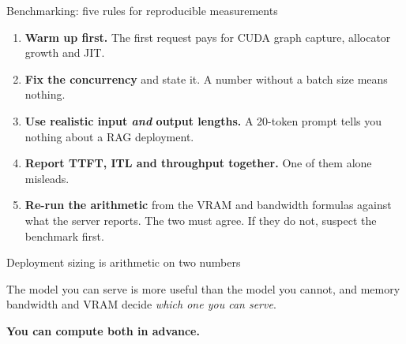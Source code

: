 \documentclass[aspectratio=169,10pt]{beamer}
\begin{document}
\begin{frame}{Benchmarking: five rules for reproducible measurements}
  \begin{enumerate}
    \item \textbf{Warm up first.} The first request pays for CUDA graph
          capture, allocator growth and JIT.
    \item \textbf{Fix the concurrency} and state it. A number without a batch
          size means nothing.
    \item \textbf{Use realistic input \emph{and} output lengths.}
          A 20-token prompt tells you nothing about a RAG deployment.
    \item \textbf{Report TTFT, ITL and throughput together.}
          One of them alone misleads.
    \item \textbf{Re-run the arithmetic} from the VRAM and bandwidth formulas
          against what the server reports. The two must agree. If they do not,
          suspect the benchmark first.
  \end{enumerate}
\end{frame}

\begin{frame}{Deployment sizing is arithmetic on two numbers}
  \vspace{1.4em}
  \begin{center}
    \begin{minipage}{0.9\textwidth}
      \begin{alertblock}{}
        \centering\large
        The model you can serve is more useful than the model you cannot,
        and memory bandwidth and VRAM decide \emph{which one you can serve}.

        \vspace{0.5em}
        \textbf{You can compute both in advance.}
      \end{alertblock}
    \end{minipage}
  \end{center}
\end{frame}
\end{document}

